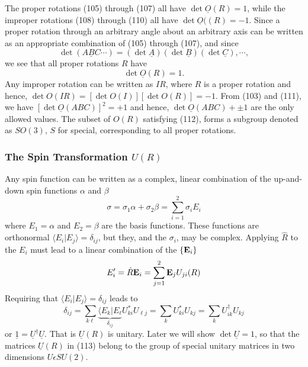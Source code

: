 The proper rotations (105) through (107) all have $\det 
\underline{O}(R) = 1$, while the improper rotations (108) through 
(110) all have $\det \underline{O}((R) = -1$.  Since a proper rotation 
through an arbitrary angle about an arbitrary axis can be written as 
an appropriate combination of (105) through (107), and since
\begin{equation}
\det ( \underline{ABC} \cdots ) = ( \det \underline{A} ) ( \det 
\underline{B} ) ( \det \underline{C} ) , \cdots ,
\label{chap16-eqno111}
\end{equation}
we see that all proper rotations $R$ have
\begin{equation}
\det \underline{O} ( R) = 1.
\label{chap16-eqno112}
\end{equation}
Any improper rotation can be written as $IR$, where $R$ is a proper 
rotation and hence, $\det O(IR) = [\det O(I)][\det O(R)]=-1$.  From 
(103) and (111), we have $[\det \underline{O}(ABC)]^2 = +1$ and 
hence, $\det \underline{O} (ABC) + \pm 1$ are the only allowed 
values.  The subset of $O(R)$ satisfying (112), forms a subgroup 
denoted as $SO(3)$, $S$ for special, corresponding to all proper 
rotations.

\subsubsection{The Spin Transformation $U(R)$}

Any spin function can be written as a complex, linear combination of 
the up-and-down spin functions $\alpha$ and $\beta$
\begin{equation}
\sigma = \sigma_1 \alpha + \sigma_2 \beta = \sum^{2}_{i=1} \sigma_i 
E_i
\end{equation}
where $E_1 = \alpha$ and $E_2 = \beta$ are the basis functions.  
These functions are orthonormal $\langle E_i | E_j \rangle = 
\delta_{ij}$, but they, and the $\sigma_i$, may be complex.  
Applying ${\hat{R}}$ to the $E_i$ must lead to a linear combination of 
the $\{{\bf E}_i\}$
\begin{equation}
E^{\prime}_i = {\hat{R}} {\bf E}_i = \sum^{2}_{j=1} {\bf E}_j U_{ji} 
(R)
\label{chap16-eqno113}
\end{equation}
Requiring that $\langle E_i | E_j \rangle = \delta_{ij}$ leads to
\begin{equation}
\delta_{ij} = \sum_{k\ell} \underbrace{\langle E_k | 
E_{\ell}}_{\delta_{ij}} U^*_{ki} U_{\ell j} = \sum_{k} U^*_{ki}U_{kj} = 
\sum_{k} U^{\dag}_{ik} U_{kj}
\end{equation}
or $\underline{1} = \underline{U}^{\dag}\underline{U}$. That is 
$\underline{U}(R)$ is unitary.  Later we will show $\det 
\underline{U} = 1$, so that the matrices $\underline{U}(R)$ in (113) 
belong to the group of special unitary matrices in two dimensions $U 
\epsilon SU(2)$.

